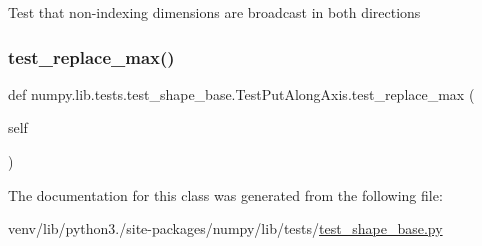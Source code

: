 \begin{DoxyVerb}Test that non-indexing dimensions are broadcast in both directions \end{DoxyVerb}
 \mbox{\label{classnumpy_1_1lib_1_1tests_1_1test__shape__base_1_1TestPutAlongAxis_accfb59a725b9f96449f4fdb3ce728d92}} 
\subsubsection{\texorpdfstring{test\+\_\+replace\+\_\+max()}{test\_replace\_max()}}
{\footnotesize\ttfamily def numpy.\+lib.\+tests.\+test\+\_\+shape\+\_\+base.\+Test\+Put\+Along\+Axis.\+test\+\_\+replace\+\_\+max (\begin{DoxyParamCaption}\item[{}]{self }\end{DoxyParamCaption})}



The documentation for this class was generated from the following file\+:\begin{DoxyCompactItemize}
\item 
venv/lib/python3./site-\/packages/numpy/lib/tests/\hyperlink{lib_2tests_2test__shape__base_8py}{test\+\_\+shape\+\_\+base.\+py}\end{DoxyCompactItemize}

